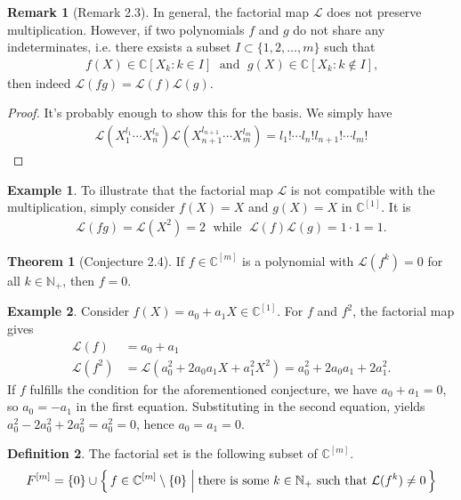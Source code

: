 \documentclass[a4paper]{article}
\theoremstyle{definition}
\newtheorem{definition}{Definition}[]
\newtheorem{example}{Example}[definition]
\newtheorem{theorem}[definition]{Theorem}
\newtheorem*{remark}{Remark}
\newcommand{\makeset}[2]{\mleft\{\, #1 \; \middle| \; #2 \,\mright\}}
\begin{document}
%
\begin{remark}[Remark 2.3]
    In general, the factorial map \(\mathcal{L}\) does not preserve multiplication. However, if two polynomials \(f\) and \(g\) do not share any indeterminates, i.e. there exsists a subset \(I \subset \{1, 2, \ldots, m\}\) such that
    \begin{align*}
        f(X) \in \mathbb{C}[X_k : k \in I] \; \text{ and } \; g(X) \in \mathbb{C}[X_k : k \not\in I] \text{,}
    \end{align*}
    then indeed \(\mathcal{L}(fg) = \mathcal{L}(f)\mathcal{L}(g)\).
\end{remark}
%
\begin{proof}
    It's probably enough to show this for the basis. We simply have
    \begin{align*}
        \mathcal{L}(X_1^{l_1} \cdots X_n^{l_n})\mathcal{L}(X_{n+1}^{l_{n+1}} \cdots X_m^{l_m}) = l_1! \cdots l_n! l_{n+1}! \cdots l_m!
    \end{align*}
\end{proof}
%
\begin{example}
    To illustrate that the factorial map \(\mathcal{L}\) is not compatible with the multiplication, simply consider \(f(X) = X\) and \(g(X) = X\) in \(\mathbb{C}^{[1]}\). It is
    \begin{align*}
        \mathcal{L}(fg) = \mathcal{L}(X^2) = 2 \;\text{ while } \;\mathcal{L}(f) \mathcal{L}(g) = 1 \cdot 1 = 1 \text{.}
    \end{align*}
\end{example}
%
\begin{theorem}[Conjecture 2.4]
    If \(f \in \mathbb{C}^{[m]}\) is a polynomial with \(\mathcal{L}(f^k) = 0\) for all \(k \in \mathbb{N}_+\), then \(f = 0\).
\end{theorem}
%
\begin{example}
    Consider \(f(X) = a_0 + a_1X \in \mathbb{C}^{[1]}\). For \(f\) and \(f^2\), the factorial map gives
    \begin{align*}
        \mathcal{L}(f) &= a_0 + a_1 \\
        \mathcal{L}(f^2) &= \mathcal{L}(a_0^2 + 2a_0 a_1 X + a_1^2 X^2) = a_0^2 + 2 a_0 a_1 + 2 a_1^2 \text{.}
    \end{align*}    
    If \(f\) fulfills the condition for the aforementioned conjecture, we have \(a_0 + a_1 = 0\), so \(a_0 = -a_1\) in the first equation. Substituting in the second equation, yields \(a_0^2 - 2 a_0^2 + 2a_0^2 = a_0^2 = 0\), hence \(a_0 = a_1 = 0\).
\end{example}
%
\begin{definition}
    The factorial set is the following subset of \(\mathbb{C}^{[m]}\).
    \begin{align*}
        F^{[m]} = \{0\} \cup \makeset{f \in \mathbb{C}^{[m]} \setminus \{0\}}{\text{there is some }k \in \mathbb{N}_+ \text{ such that }\mathcal{L}(f^k) \neq 0}
    \end{align*}
\end{definition}
%
\newpage
\end{document}
